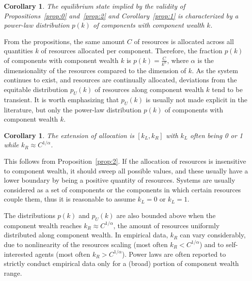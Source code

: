 \documentclass[10pt,letterpaper]{article}
\newtheorem{corollary}[theorem2]{Corollary}
\begin{document}
\begin{corollary}\label{prop:3}
	The equilibrium state implied by the validity of Propositions~\ref{prop:0} and~\ref{prop:2} and Corollary~\ref{prop:1} is characterized by a power-law distribution $p(k)$ of components with component wealth $k$.
\end{corollary}

From the propositions, the same amount $C$ of resources is allocated
across all quantities $k$ of resources allocated per component.
Therefore, the fraction $p(k)$ of components with component wealth $k$ is
$p(k)=\frac{C}{k^\alpha}$, where $\alpha$ is
the dimensionality of the resources compared to the dimension of $k$.
As the system continues to exist,
and resources are continually allocated, deviations from the equitable distribution $p_U(k)$ of resources along component wealth $k$  tend to be transient. It is worth emphasizing that $p_U(k)$ is usually not made explicit in the literature, but only
 the power-law distribution $p(k)$ of components
with component wealth $k$.

\begin{corollary}\label{cor:2}
  The extension of allocation is $[k_L,k_R]$ with $k_L$ often being 0 or 1 while $k_R\approx C^{1/\alpha}$.
\end{corollary}

This follows from Proposition~\ref{prop:2}.
If the allocation of resources is insensitive to component wealth,
it should sweep all possible values, and these usually
have a lower boundary by being a positive quantity of resources.
Systems are usually considered as a set of components
or the components in which certain resources couple them,
thus it is reasonable to assume $k_L=0$ or $k_L=1$.

The distributions $p(k)$ and $p_U(k)$ are also
bounded above when the component wealth reaches $k_R \approx C^{1/\alpha}$,
the amount of resources uniformly distributed along component wealth.
In empirical data, $k_R$ can vary considerably, due to
nonlinearity of the resources scaling (most often $k_R<C^{1/\alpha}$) and
to self-interested agents (most often $k_R>C^{1/\alpha}$).
Power laws are often reported to strictly conduct empirical data
only for a (broad) portion of component wealth range.
\end{document}
